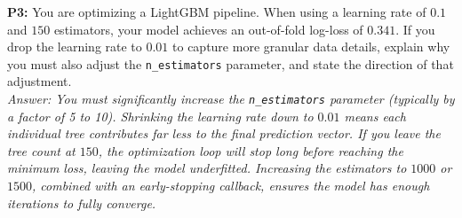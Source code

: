 \documentclass{article}
\begin{document}
\newline
\textbf{P3:} You are optimizing a LightGBM pipeline. When using a learning rate of $0.1$ and $150$ estimators, your model achieves an out-of-fold log-loss of $0.341$. If you drop the learning rate to $0.01$ to capture more granular data details, explain why you must also adjust the \texttt{n\_estimators} parameter, and state the direction of that adjustment.
\\
\textit{Answer: You must significantly increase the \texttt{n\_estimators} parameter (typically by a factor of 5 to 10). Shrinking the learning rate down to $0.01$ means each individual tree contributes far less to the final prediction vector. If you leave the tree count at $150$, the optimization loop will stop long before reaching the minimum loss, leaving the model underfitted. Increasing the estimators to $1000$ or $1500$, combined with an early-stopping callback, ensures the model has enough iterations to fully converge.}
\end{document}
